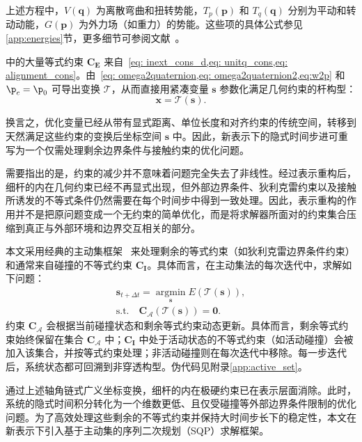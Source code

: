 \vspace{-0.5cm}
上述方程中，$V(\mathbf q)$ 为离散弯曲和扭转势能，$T_p(\mathbf p)$ 和 $T_q(\mathbf q)$ 分别为平动和转动动能，$G\left(\mathbf{p}\right)$ 为外力场（如重力）的势能。这些项的具体公式参见\ref{app:energies}节，更多细节可参阅文献~\cite{spillmann_corde_2007,wen_cosserat_2020}。

 中的大量等式约束 $\mathbf{C_E}$ 来自~\cref{eq: inext_cons_d,eq: unitq_cons,eq: alignment_cons}。由~\cref{eq: omega2quaternion,eq: omega2quaternion2,eq:w2p} 和 $\p_c=\p_0$ 可导出变换 $\mathcal{T}$，从而直接用紧凑变量 $\mathbf{s}$ 参数化满足几何约束的杆构型：
\begin{equation}
  \mathbf{x} = \mathcal{T}\left( \mathbf{s} \right).
\end{equation}

换言之，优化变量已经从带有显式距离、单位长度和对齐约束的传统空间，转移到天然满足这些约束的变换后坐标空间 $\mathbf{s}$ 中。因此，新表示下的隐式时间步进可重写为一个仅需处理剩余边界条件与接触约束的优化问题。

需要指出的是，约束的减少并不意味着问题完全失去了非线性。经过表示重构后，细杆的内在几何约束已经不再显式出现，但外部边界条件、狄利克雷约束以及接触所诱发的不等式条件仍然需要在每个时间步中得到一致处理。因此，表示重构的作用并不是把原问题变成一个无约束的简单优化，而是将求解器所面对的约束集合压缩到真正与外部环境和边界交互相关的部分。

本文采用经典的主动集框架~\cite{nocedal1999numerical} 来处理剩余的等式约束（如狄利克雷边界条件约束）和通常来自碰撞的不等式约束 $\mathbf{C_I}$。具体而言，在主动集法的每次迭代中，求解如下问题：
\begin{equation}
\begin{gathered}
    {\mathbf{s}}_{t+\Delta t} = \mathop{\arg \min}\limits_{{\mathbf s}} E(\mathcal{T}\left({\mathbf{s}}\right)), \\
    \text{s.t.}\quad
    \mathbf{C_{\mathcal A}} (\mathcal{T}\left({\mathbf{s}} \right))= \mathbf{0}.
    \end{gathered}
    \label{eq: trans_opt}
\end{equation}
约束 $\mathbf{C_{\mathcal A}}$ 会根据当前碰撞状态和剩余等式约束动态更新。具体而言，剩余等式约束始终保留在集合 $\mathbf{C_{\mathcal A}}$ 中；$\mathbf{C_I}$ 中处于活动状态的不等式约束（如活动碰撞）会被加入该集合，并按等式约束处理；非活动碰撞则在每次迭代中移除。每一步迭代后，系统状态都可回溯到非穿透构型。伪代码见附录\ref{app:active_set}。

通过上述轴角链式广义坐标变换，细杆的内在极硬约束已在表示层面消除。此时，系统的隐式时间积分转化为一个维数更低、且仅受碰撞等外部边界条件限制的优化问题。为了高效处理这些剩余的不等式约束并保持大时间步长下的稳定性，本文在新表示下引入基于主动集的序列二次规划（SQP）求解框架。
